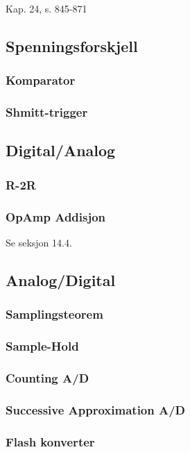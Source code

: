 Kap. 24, s. 845-871

\subsection{Spenningsforskjell}
  \subsubsection{Komparator}
    
  \subsubsection{Shmitt-trigger}
    
\subsection{Digital/Analog}
  \subsubsection{R-2R}
    
  \subsubsection{OpAmp Addisjon}
    Se seksjon 14.4.
\subsection{Analog/Digital}
  \subsubsection{Samplingsteorem}
    
  \subsubsection{Sample-Hold}
    
  \subsubsection{Counting A/D}
    
  \subsubsection{Successive Approximation A/D}
    
  \subsubsection{Flash konverter}
    
